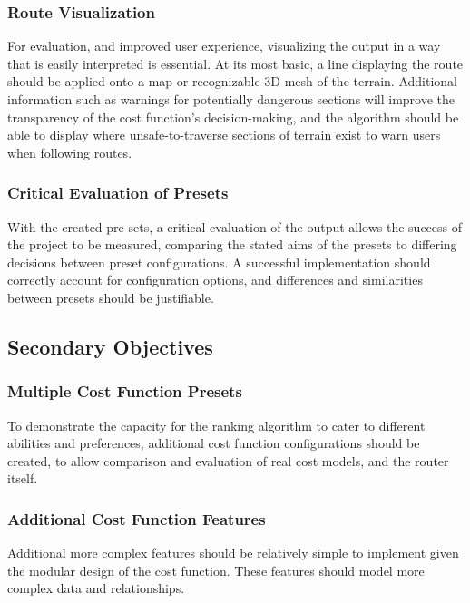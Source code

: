 \documentclass[12pt]{article}
\begin{document}
\subsubsection{Route Visualization}

For evaluation, and improved user experience, visualizing the output in a way that is easily interpreted is essential. At its most basic, a line displaying the route should be applied onto a map or recognizable 3D mesh of the terrain. Additional information such as warnings for potentially dangerous sections will improve the transparency of the cost function's decision-making, and the algorithm should be able to display where unsafe-to-traverse sections of terrain exist to warn users when following routes.

\subsubsection{Critical Evaluation of Presets}

With the created pre-sets, a critical evaluation of the output allows the success of the project to be measured, comparing the stated aims of the presets to differing decisions between preset configurations. A successful implementation should correctly account for configuration options, and differences and similarities between presets should be justifiable.

\subsection{Secondary Objectives}

\subsubsection{Multiple Cost Function Presets}

To demonstrate the capacity for the ranking algorithm to cater to different abilities and preferences, additional cost function configurations should be created, to allow comparison and evaluation of real cost models, and the router itself.

\subsubsection{Additional Cost Function Features}

Additional more complex features should be relatively simple to implement given the modular design of the cost function. These features should model more complex data and relationships.
\end{document}
